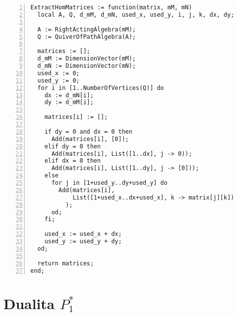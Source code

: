       \begin{Verbatim}[frame=single,numbers=left] 
ExtractHomMatrices := function(matrix, mM, mN)
  local A, Q, d_mM, d_mN, used_x, used_y, i, j, k, dx, dy;

  A := RightActingAlgebra(mM);
  Q := QuiverOfPathAlgebra(A);

  matrices := [];
  d_mM := DimensionVector(mM);
  d_mN := DimensionVector(mN);
  used_x := 0;
  used_y := 0;
  for i in [1..NumberOfVertices(Q)] do
    dx := d_mN[i];
    dy := d_mM[i];

    matrices[i] := [];

    if dy = 0 and dx = 0 then
      Add(matrices[i], [0]);
    elif dy = 0 then
      Add(matrices[i], List([1..dx], j -> 0));
    elif dx = 0 then
      Add(matrices[i], List([1..dy], j -> [0]));
    else
      for j in [1+used_y..dy+used_y] do
        Add(matrices[i], 
            List([1+used_x..dx+used_x], k -> matrix[j][k])
          );
      od;
    fi;

    used_x := used_x + dx;
    used_y := used_y + dy;
  od;

  return matrices;
end;        
      \end{Verbatim}
      
      
      
      

  \section{Dualita $P_1^*$}\label{dualita-p-hom}
  
